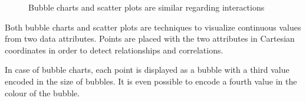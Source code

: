 \begin{figure}
  \centering
    \qquad
    \caption{Bubble charts and scatter plots are similar regarding interactions}%
    \label{fig:analysis:bubble-chart}
\end{figure}

Both bubble charts and scatter plots are techniques to visualize continuous values from two data attributes.
Points are placed with the two attributes in Cartesian coordinates in order to detect relationships and correlations.

In case of bubble charts, each point is displayed as a bubble with a third value encoded in the size of bubbles.
It is even possible to encode a fourth value in the colour of the bubble.

